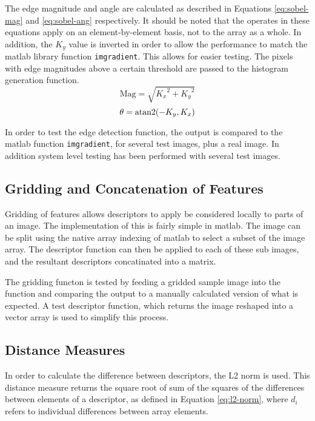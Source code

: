 The edge magnitude and angle are calculated as described in Equations \ref{eq:sobel-mag} and \ref{eq:sobel-ang} respectively. It should be noted that the operates in these equations apply on an element-by-element basis, not to the array as a whole. In addition, the $K_y$ value is inverted in order to allow the performance to match the \gls{matlab} library function \texttt{imgradient}. This allows for easier testing. The pixels with edge magnitudes above a certain threshold are passed to the histogram generation function.
\begin{equation}
\text{Mag} = \sqrt{{K_x}^2 + {K_y}^2}
\label{eq:sobel-mag}
\end{equation}
\begin{equation}
\theta = \operatorname{atan2}(-K_y, K_x)
\label{eq:sobel-ang}
\end{equation}

In order to test the edge detection function, the output is compared to the \gls{matlab} function \texttt{imgradient}, for several test images, plus a real image. In addition system level testing has been performed with several test images.
\subsection{Gridding and Concatenation of Features} \label{sec:gridding-concatenation}
Gridding of features allows descriptors to apply be considered locally to parts of an image. The implementation of this is fairly simple in \gls{matlab}. The image can be split using the native array indexing of \gls{matlab} to select a subset of the image array. The descriptor function can then be applied to each of these sub images, and the resultant descriptors concatinated into a matrix.

The gridding functon is tested by feeding a gridded sample image into the function and comparing the output to a manually calculated version of what is expected. A test descriptor function, which returns the image reshaped into a vector array is used to simplify this process.

\subsection{Distance Measures} \label{sec:distance-measures}

In order to calculate the difference between descriptors, the L2 norm is used. This distance measure returns the square root of sum of the squares of the differences between elements of a descriptor, as defined in Equation \ref{eq:l2-norm}, where $d_i$ refers to individual differences between array elements.

